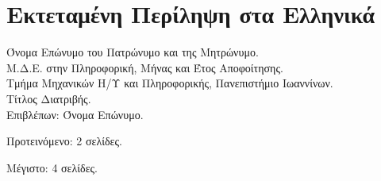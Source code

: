 \chapter*{Εκτεταμένη Περίληψη στα Ελληνικά}

Όνομα Επώνυμο του Πατρώνυμο και της Μητρώνυμο.\\
Μ.Δ.Ε. στην Πληροφορική, Μήνας και Έτος Αποφοίτησης.\\
Τμήμα Μηχανικών Η/Υ και Πληροφορικής, Πανεπιστήμιο Ιωαννίνων.\\
Τίτλος Διατριβής.\\
Επιβλέπων: Όνομα Επώνυμο.\\
\bigskip

\y\noindent Προτεινόμενο: 2 σελίδες.

\y\noindent Μέγιστο: 4 σελίδες.